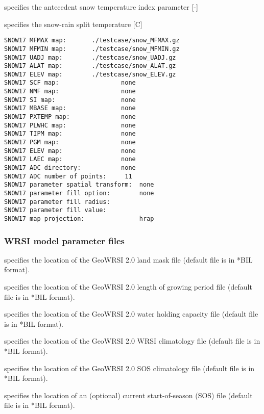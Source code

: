   specifies the
 antecedent snow temperature index parameter [-]

  specifies the
 snow-rain split temperature [C]

 
 \begin{Verbatim}[frame=single]
SNOW17 MFMAX map:       ./testcase/snow_MFMAX.gz
SNOW17 MFMIN map:       ./testcase/snow_MFMIN.gz
SNOW17 UADJ map:        ./testcase/snow_UADJ.gz
SNOW17 ALAT map:        ./testcase/snow_ALAT.gz
SNOW17 ELEV map:        ./testcase/snow_ELEV.gz
SNOW17 SCF map:                 none
SNOW17 NMF map:                 none
SNOW17 SI map:                  none
SNOW17 MBASE map:               none
SNOW17 PXTEMP map:              none
SNOW17 PLWHC map:               none
SNOW17 TIPM map:                none
SNOW17 PGM map:                 none
SNOW17 ELEV map:                none
SNOW17 LAEC map:                none
SNOW17 ADC directory:           none
SNOW17 ADC number of points:     11
SNOW17 parameter spatial transform:  none
SNOW17 parameter fill option:        none
SNOW17 parameter fill radius:
SNOW17 parameter fill value:
SNOW17 map projection:               hrap
 \end{Verbatim}


 
 \subsubsection{WRSI model parameter files} 
  specifies the location of the GeoWRSI 2.0
   land mask file (default file is in *BIL format).

  specifies the 
   location of the GeoWRSI 2.0 length of growing period file
   (default file is in *BIL format).

  specifies the 
   location of the GeoWRSI 2.0 water holding capacity file
   (default file is in *BIL format).

  specifies the 
   location of the GeoWRSI 2.0 WRSI climatology file
   (default file is in *BIL format).

  specifies the 
   location of the GeoWRSI 2.0 SOS climatology file
   (default file is in *BIL format).

  specifies the 
   location of an (optional) current start-of-season (SOS) file
   (default file is in *BIL format).

